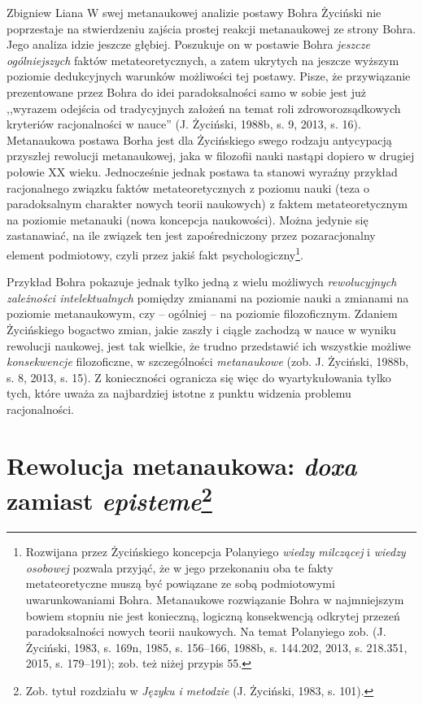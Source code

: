 \begin{artplenv}{Zbigniew Liana}
W swej metanaukowej analizie postawy Bohra Życiński nie poprzestaje na stwierdzeniu zajścia prostej reakcji metanaukowej
ze strony Bohra. Jego analiza idzie jeszcze głębiej. Poszukuje on w postawie Bohra \textit{jeszcze} \textit{ogólniejszych
}faktów metateoretycznych, a zatem ukrytych na jeszcze wyższym poziomie dedukcyjnych warunków możliwości tej postawy.
Pisze, że przywiązanie prezentowane przez Bohra do idei paradoksalności samo w sobie jest już ,,wyrazem odejścia od
tradycyjnych założeń na temat roli zdroworozsądkowych kryteriów racjonalności w nauce'' \label{ref:RND7AT9mZ6IoG}(J.
Życiński, 1988b, s. 9, 2013, s. 16). Metanaukowa postawa Borha jest dla Życińskiego swego rodzaju antycypacją przyszłej
rewolucji metanaukowej, jaka w filozofii nauki nastąpi dopiero w drugiej połowie XX wieku. Jednocześnie jednak postawa
ta stanowi wyraźny przykład racjonalnego związku faktów metateoretycznych z poziomu nauki (teza o paradoksalnym
charakter nowych teorii naukowych) z faktem metateoretycznym na poziomie metanauki (nowa koncepcja naukowości). Można
jedynie się zastanawiać, na ile związek ten jest zapośredniczony przez pozaracjonalny element podmiotowy, czyli przez
jakiś fakt psychologiczny\footnote{Rozwijana przez Życińskiego koncepcja Polanyiego \textit{wiedzy milczącej} i
\textit{wiedzy osobowej }pozwala przyjąć, że w jego przekonaniu oba te fakty metateoretyczne muszą być powiązane ze sobą
podmiotowymi uwarunkowaniami Bohra. Metanaukowe rozwiązanie Bohra w najmniejszym bowiem stopniu nie jest konieczną,
logiczną konsekwencją odkrytej przezeń paradoksalności nowych teorii naukowych. Na temat Polanyiego zob.
\label{ref:RNDgm9vg5CtBx}(J. Życiński, 1983, s. 169n, 1985, s. 156–166, 1988b, s. 144.202, 2013, s. 218.351, 2015, s. 179–191);
zob. też niżej przypis 55.}.

Przykład Bohra pokazuje jednak tylko jedną z wielu możliwych \textit{rewolucyjnych zależności intelektualnych} pomiędzy
zmianami na poziomie nauki a zmianami na poziomie metanaukowym, czy -- ogólniej -- na poziomie filozoficznym. Zdaniem
Życińskiego bogactwo zmian, jakie zaszły i ciągle zachodzą w nauce w wyniku rewolucji naukowej, jest tak wielkie, że
trudno przedstawić ich wszystkie możliwe \textit{konsekwencje} filozoficzne, w szczególności \textit{metanaukowe}
\label{ref:RNDJXAyHhUuS3}(zob. J. Życiński, 1988b, s. 8, 2013, s. 15). Z konieczności ogranicza się więc do
wyartykułowania tylko tych, które uważa za najbardziej istotne z punktu widzenia problemu racjonalności.

\section[Rewolucja metanaukowa: \textit{doxa} zamiast \textit{episteme}]{Rewolucja metanaukowa: \textit{doxa} zamiast \textit{episteme}\footnote{Zob. tytuł rozdziału w \textit{Języku i metodzie} \label{ref:RNDDNOb8iCJVi}(J. Życiński, 1983, s. 101).}}


\end{artplenv}
